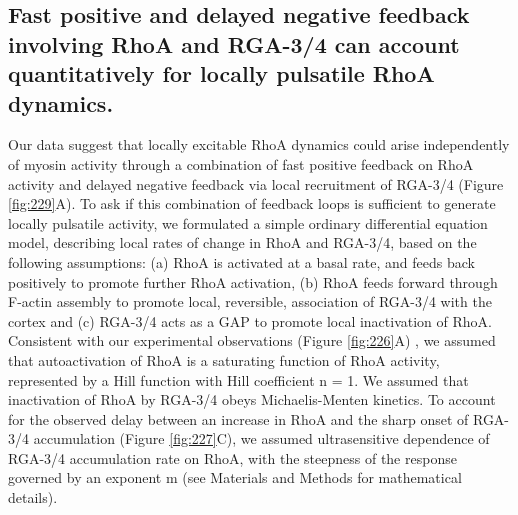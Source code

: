 \subsection{Fast positive and delayed negative feedback involving RhoA and RGA-3/4 can account quantitatively for locally pulsatile RhoA dynamics.}
\label{sec:25}
Our data suggest that locally excitable RhoA dynamics could arise independently of myosin activity through a combination of fast positive feedback on RhoA activity and delayed negative feedback via local recruitment of RGA-3/4 (Figure \ref{fig:229}A).  To ask if this combination of feedback loops is sufficient to generate locally pulsatile activity, we formulated a simple ordinary differential equation model, describing local rates of change in RhoA and RGA-3/4, based on the following assumptions:  (a)  RhoA is activated at a basal rate, and feeds back positively to promote further RhoA activation, (b) RhoA feeds forward through F-actin assembly to promote local, reversible, association of RGA-3/4 with the cortex and (c) RGA-3/4 acts as a GAP to promote local inactivation of RhoA. Consistent with our experimental observations (Figure \ref{fig:226}A) , we assumed that autoactivation of RhoA is a saturating function of RhoA activity, represented by a Hill function with Hill coefficient n = 1. We assumed that inactivation of RhoA by RGA-3/4 obeys Michaelis-Menten kinetics. To account for the observed delay between an increase in RhoA and the sharp onset of RGA-3/4 accumulation (Figure \ref{fig:227}C), we assumed ultrasensitive dependence of RGA-3/4 accumulation rate on RhoA, with the steepness of the response governed by an exponent m (see Materials and Methods for mathematical details). 



